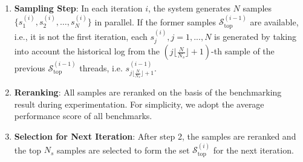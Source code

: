 \documentclass{article} %
\begin{document}
\begin{enumerate}
    \item \textbf{Sampling Step}: In each iteration $ i $, the system generates $ N $ samples $ \{ s_1^{(i)}, s_2^{(i)}, \dots, s_N^{(i)} \} $ in parallel. If the former samples $\mathcal{S}^{(i-1)}_{\text{top}}$ are available, i.e., it is not the first iteration, each $ s_j^{(i)}, j=1, ..., N$ is generated by taking into account the historical log from the $\left(j \lfloor \frac{N}{N_s} \rfloor + 1\right)$-th sample of the previous $\mathcal{S}^{(i-1)}_{\text{top}}$ threads, i.e. $s_{j \lfloor \frac{N}{N_s} \rfloor + 1}^{(i-1)}$. 
    \item \textbf{Reranking}: All samples are reranked on the basis of the benchmarking result during experimentation. For simplicity, we adopt the average performance score of all benchmarks. 
    \item \textbf{Selection for Next Iteration}: After step 2, the samples are reranked and the top $ N_s $ samples are selected to form the set $ \mathcal{S}^{(i)}_{\text{top}} $ for the next iteration.
\end{enumerate}




\end{document}
